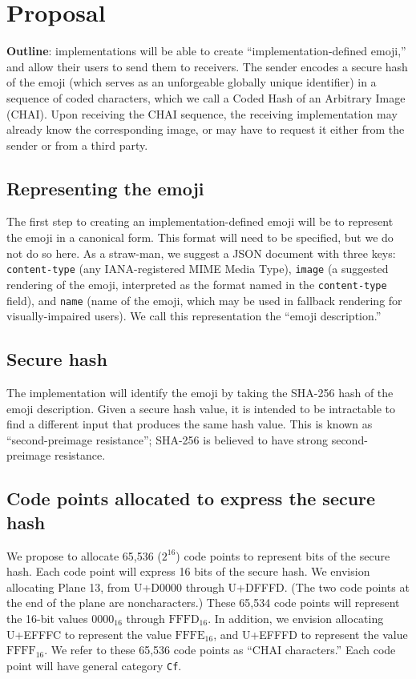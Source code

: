 \documentclass[12pt]{article}
\begin{document}
\section{Proposal}

\textbf{Outline}: implementations will be able to create
``implementation-defined emoji,'' and allow their users to send them
to receivers. The sender encodes a secure hash of the emoji (which
serves as an unforgeable globally unique identifier) in a sequence of
coded characters, which we call a Coded Hash of an Arbitrary Image
(CHAI). Upon receiving the CHAI sequence, the receiving implementation
may already know the corresponding image, or may have to request it
either from the sender or from a third party.

\subsection{Representing the emoji}

The first step to creating an implementation-defined emoji will be to
represent the emoji in a canonical form. This format will need to be
specified, but we do not do so here. As a straw-man, we suggest a JSON
document with three keys: \texttt{content-type} (any IANA-registered MIME
Media Type), \texttt{image} (a suggested rendering of the emoji,
interpreted as the format named in the \texttt{content-type} field), and
\texttt{name} (name of the emoji, which may be used in fallback
rendering for visually-impaired users). We call this representation
the ``emoji description.''

\subsection{Secure hash}

The implementation will identify the emoji by taking the SHA-256 hash
of the emoji description. Given a secure hash value, it is intended to be
intractable to find a different input that produces the same
hash value. This is known as ``second-preimage resistance'';
SHA-256 is believed to have strong second-preimage resistance.

\subsection{Code points allocated to express the secure hash}

We propose to allocate 65,536 ($2^{16}$) code points to represent bits
of the secure hash. Each code point will express 16 bits of the secure
hash. We envision allocating Plane 13, from U+D0000 through
U+DFFFD. (The two code points at the end of the plane are
noncharacters.) These 65,534 code points will represent the 16-bit
values $\mathrm{0000}_{16}$ through $\mathrm{FFFD}_{16}$. In addition,
we envision allocating U+EFFFC to represent the value
$\mathrm{FFFE}_{16}$, and U+EFFFD to represent the value
$\mathrm{FFFF}_{16}$. We refer to these 65,536 code points as ``CHAI
characters.'' Each code point will have general category \texttt{Cf}.
\end{document}
